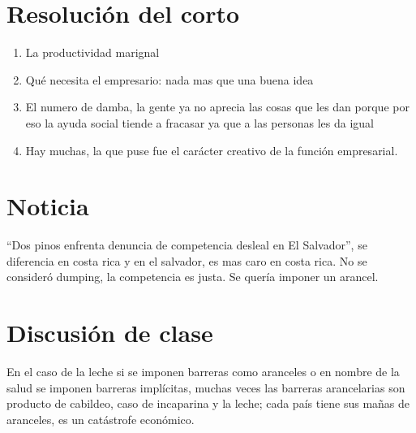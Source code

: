 \section{Resolución del corto}
\begin{enumerate}
    \item La productividad marignal 
    \item Qué necesita el empresario: nada mas que una buena idea
    \item El numero de damba, la gente ya no aprecia las cosas que les dan porque por eso la ayuda social tiende a fracasar ya que a las personas les da igual
    \item Hay muchas, la que puse fue el carácter creativo de la función empresarial.
\end{enumerate}

\section{Noticia}
``Dos pinos enfrenta denuncia de competencia desleal en El Salvador'', se diferencia en costa rica y en el salvador, es mas caro en costa rica. No se consideró dumping, la competencia es justa. Se quería imponer un arancel.

\section{Discusión de clase}
En el caso de la leche si se imponen barreras como aranceles o en nombre de la salud se imponen barreras implícitas, muchas veces las barreras arancelarias son producto de cabildeo, caso de incaparina y la leche; cada país tiene sus mañas de aranceles, es un catástrofe económico.

